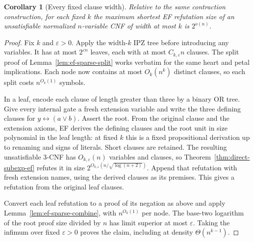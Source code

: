 \documentclass[11pt]{article}
\newtheorem{corollary}[theorem]{Corollary}
\theoremstyle{definition}
\theoremstyle{remark}
\begin{document}
\begin{corollary}[Every fixed clause width]\label{cor:fixed-width}
Relative to the same contraction construction, for each fixed $k$ the
maximum shortest EF refutation size of an unsatisfiable normalized
$n$-variable CNF of width at most $k$ is $2^{o(n)}$.
\end{corollary}
\begin{proof}
Fix $k$ and $\varepsilon>0$. Apply the width-$k$ IPZ tree
\cite[Theorem~1 and Corollary~1]{ipz} before introducing any variables.
It has at most $2^{\varepsilon n}$ leaves, each with at most
$C_{k,\varepsilon}n$ clauses. The split proof of
Lemma~\ref{lem:ef-sparse-split} works verbatim for the same heart
and petal implications. Each node now contains at most $O_k(n^k)$
distinct clauses, so each split costs $n^{O_k(1)}$ symbols.

In a leaf, encode each clause of length greater than three by a
binary OR tree. Give every internal gate a fresh extension variable
and write the three defining clauses for $y\leftrightarrow(a\lor b)$.
Assert the root. From the original clause and the extension axioms,
EF derives the defining clauses and the root unit in size polynomial
in the leaf length: at fixed $k$ this is a fixed propositional
derivation up to renaming and signs of literals. Short clauses are
retained. The resulting unsatisfiable 3-CNF has
$O_{k,\varepsilon}(n)$ variables and clauses, so
Theorem~\ref{thm:direct-subexp-ef} refutes it in size
$2^{O_{k,\varepsilon}(n/\sqrt{\log(n+2)})}$. Append that refutation
with fresh extension names, using the derived clauses as its premises.
This gives a refutation from the original leaf clauses.

Convert each leaf refutation to a proof of its negation as above and
apply Lemma~\ref{lem:ef-sparse-combine}, with $n^{O_k(1)}$ per node.
The base-two logarithm of the root proof size divided by $n$ has
limit superior at most $\varepsilon$. Taking the infimum over fixed
$\varepsilon>0$ proves the claim, including at density $\Theta(n^{k-1})$.
\end{proof}
\end{document}
